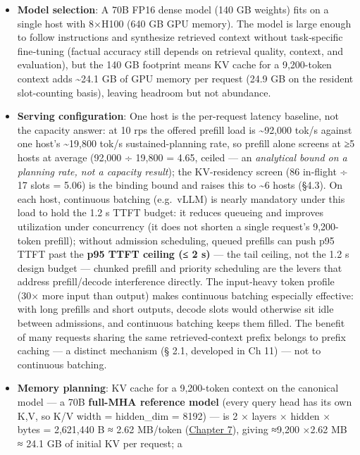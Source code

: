 \begin{figure}
\end{figure}\begin{itemize}
\tightlist
\item
  \textbf{Model selection}: A 70B FP16 dense model (140 GB weights) fits
  on a single host with 8×H100 (640 GB GPU memory). The model is large
  enough to follow instructions and synthesize retrieved context without
  task‑specific fine‑tuning (factual accuracy still depends on retrieval
  quality, context, and evaluation), but the 140 GB footprint means KV
  cache for a 9,200-token context adds \textasciitilde24.1 GB of GPU
  memory per request (24.9 GB on the resident slot-counting basis),
  leaving headroom but not abundance.
\item
  \textbf{Serving configuration}: One host is the per-request latency
  baseline, not the capacity answer: at 10 rps the offered prefill load
  is \textasciitilde92,000 tok/s against one host's
  \textasciitilde19,800 tok/s sustained-planning rate, so prefill alone
  screens at ≥5 hosts at average (92,000 ÷ 19,800 = 4.65, ceiled --- an
  \emph{analytical bound on a planning rate, not a capacity result});
  the KV-residency screen (86 in-flight ÷ 17 slots = 5.06) is the
  binding bound and raises this to \textasciitilde6 hosts (§4.3). On
  each host, continuous batching (e.g.~vLLM) is nearly mandatory under
  this load to hold the 1.2 s TTFT budget: it reduces queueing and
  improves utilization under concurrency (it does not shorten a single
  request's 9,200-token prefill); without admission scheduling, queued
  prefills can push p95 TTFT past the \textbf{p95 TTFT ceiling (≤ 2 s)}
  --- the tail ceiling, not the 1.2 s design budget --- chunked prefill
  and priority scheduling are the levers that address prefill/decode
  interference directly. The input‑heavy token profile (30× more input
  than output) makes continuous batching especially effective: with long
  prefills and short outputs, decode slots would otherwise sit idle
  between admissions, and continuous batching keeps them filled. The
  benefit of many requests sharing the same retrieved-context prefix
  belongs to prefix caching --- a distinct mechanism (§ 2.1, developed
  in Ch 11) --- not to continuous batching.
\item
  \textbf{Memory planning}: KV cache for a 9,200-token context on the
  canonical model --- a 70B \textbf{full-MHA reference model} (every
  query head has its own K,V, so K/V width = hidden\_dim = 8192) --- is
  2 × layers × hidden × bytes = 2,621,440 B ≈ 2.62 MB/token (\hyperref[chap:7]{Chapter 7}),
  giving ≈9,200 ×2.62 MB ≈ 24.1 GB of initial KV per request; a

\end{itemize}
